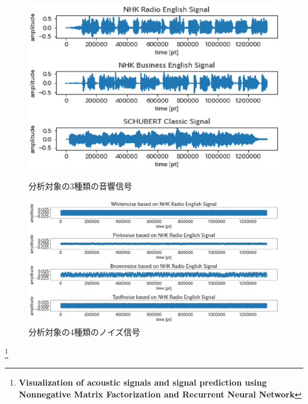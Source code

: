 \documentclass{deimj}
\begin{document}
\vspace{-12pt}
\begin{figure}[htb]
  \begin{center}
    \includegraphics[width=0.78\columnwidth]{./eps/SoundFile_Original_Signal_Plot.eps}
\vspace{-6pt}
    \caption{分析対象の3種類の音響信号}
    \vspace{-4pt}
    \label{figOriginal_Signal_Plot}
    \vspace{-4pt}
  \end{center}
\end{figure}
%
\vspace{-15pt}
%
\begin{figure}[htb]
  \begin{center}
    \includegraphics[width=0.78\columnwidth]{./eps/SoundFile_Noise_Signal_Plot.eps}
\vspace{-6pt}
    \caption{分析対象の4種類のノイズ信号}
    \label{fig:Noise_Signal_Plot}
  \end{center}
\end{figure}
\vspace{-12pt}

\renewcommand{\thefootnote}{\fnsymbol{footnote}}
\footnote[0]{
{\bf \scriptsize Visualization of acoustic signals and signal prediction using Nonnegative Matrix Factorization and Recurrent Neural Network}}
\renewcommand{\thefootnote}{\arabic{footnote}}
\end{document}
